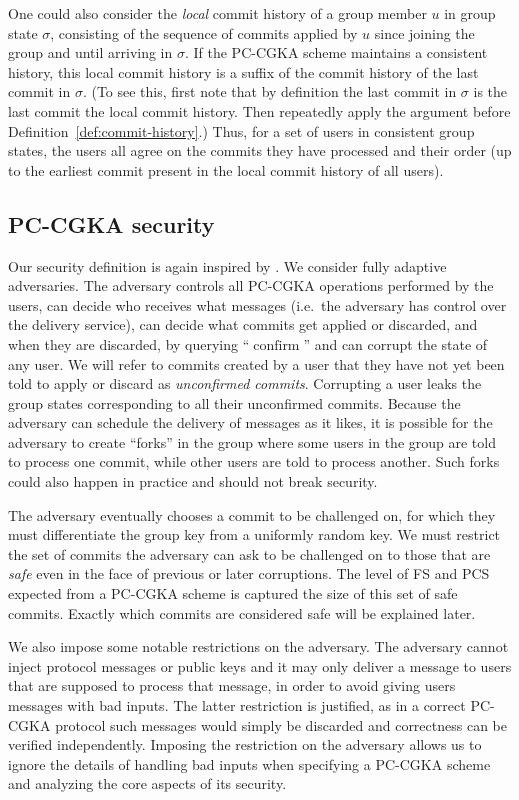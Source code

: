 One could also consider the \emph{local} commit history of a group member $u$ in group state $\sigma$, consisting of the sequence of commits applied by $u$ since joining the group and until arriving in $\sigma$. If the PC-CGKA scheme maintains a consistent history, this local commit history is a suffix of the commit history of the last commit in $\sigma$. (To see this, first note that by definition the last commit in $\sigma$ is the last commit the local commit history. Then repeatedly apply the argument before Definition~\ref{def:commit-history}.) Thus, for a set of users in consistent group states, the users all agree on the commits they have processed and their order (up to the earliest commit present in the local commit history of all users).

\subsection{PC-CGKA security}

Our security definition is again inspired by \cite{ttkem}. We consider fully adaptive adversaries. The adversary controls all PC-CGKA operations performed by the users, can decide who receives what messages (i.e.\ the adversary has control over the delivery service), can decide what commits get applied or discarded, and when they are discarded, by querying ``$\operatorname{confirm}$'' and can corrupt the state of any user. We will refer to commits created by a user that they have not yet been told to apply or discard as \emph{unconfirmed commits}. Corrupting a user leaks the group states corresponding to all their unconfirmed commits. Because the adversary can schedule the delivery of messages as it likes, it is possible for the adversary to create ``forks'' in the group where some users in the group are told to process one commit, while other users are told to process another. Such forks could also happen in practice and should not break security.

The adversary eventually chooses a commit to be challenged on, for which they must differentiate the group key from a uniformly random key. We must restrict the set of commits the adversary can ask to be challenged on to those that are \emph{safe} even in the face of previous or later corruptions. The level of FS and PCS expected from a PC-CGKA scheme is captured the size of this set of safe commits. Exactly which commits are considered safe will be explained later.

We also impose some notable restrictions on the adversary. The adversary cannot inject protocol messages or public keys and it may only deliver a message to users that are supposed to process that message, in order to avoid giving users messages with bad inputs. The latter restriction is justified, as in a correct PC-CGKA protocol such messages would simply be discarded and correctness can be verified independently. Imposing the restriction on the adversary allows us to ignore the details of handling bad inputs when specifying a PC-CGKA scheme and analyzing the core aspects of its security.

